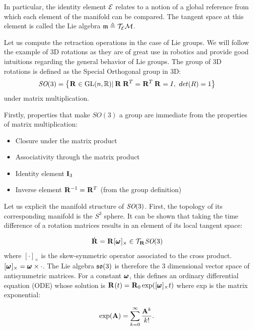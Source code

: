 In particular, the identity element $\mathcal{E}$ relates to a notion of a global reference from which each element of the manifold can be compared.
The tangent space at this element is called the Lie algebra $\mathfrak{m} \triangleq \mathcal{T}_{\mathcal{E}}\mathcal{M}$.

Let us compute the retraction operations in the case of Lie groups. We will follow the example of 3D rotations as they are of great use in robotics and provide
good intuitions regarding the general behavior of Lie groups.
The group of 3D rotations is defined as the Special Orthogonal group in 3D: 
%
\begin{equation}
    \textit{SO}(3) = \left\{\prescript{}{}{{\bf R}}_{} \in \text{GL}(n,\mathbb{R}) | \prescript{}{}{{\bf R}}_{}\prescript{}{}{{\bf R}}_{}^T=\prescript{}{}{{\bf R}}_{}^T\prescript{}{}{{\bf R}}_{}=I,~det(R)=1\right\}
\end{equation}
%
under matrix multiplication.


Firstly, properties that make $SO(3)$ a group are immediate from the properties of matrix multiplication:
%
\begin{itemize}
    \item Closure under the matrix product
    \item Associativity through the matrix product
    \item Identity element ${\bf I}_3$
    \item Inverse element $\prescript{}{}{{\bf R}}_{}^{-1} = \prescript{}{}{{\bf R}}_{}^T$ (from the group definition)
\end{itemize}

Let us explicit the manifold structure of $\textit{SO}(3)$. First, the topology of its corresponding manifold is the $S^3$ sphere.
It can be shown \cite{sola2018micro} that taking the time difference of a rotation matrices results in an element of its local tangent space:

\begin{equation}
    \dot{\prescript{}{}{{\bf R}}_{}} = \prescript{}{}{{\bf R}}_{} [\prescript{}{}{\pmb{\omega}}_{}]_{\times} \in \mathcal{T}_{\prescript{}{}{{\bf R}}_{}}\textit{SO}(3)    
\end{equation}
%
where $[\cdot]_{\times}$ is the skew-symmetric operator associated to the cross product. 
\mbox{$[\prescript{}{}{\pmb{\omega}}_{}]_{\times} = \prescript{}{}{\pmb{\omega}}_{} \times \cdot$}. The Lie algebra ${\mathfrak {so}}(3)$ is therefore the 3 dimensional vector space of antisymmetric matrices.
For a constant $\prescript{}{}{\pmb{\omega}}_{}$, this defines an ordinary differential equation (ODE) whose solution
is $\prescript{}{}{{\bf R}}_{}(t)=\prescript{}{}{{\bf R}}_{0}\exp([\prescript{}{}{\pmb{\omega}}_{}]_{\times}t)$ where exp is the matrix exponential:

\begin{equation}
    \exp({\bf A}) = \sum_{k=0}^{\infty} \frac{{\bf A}^k}{k!}.
\end{equation}

